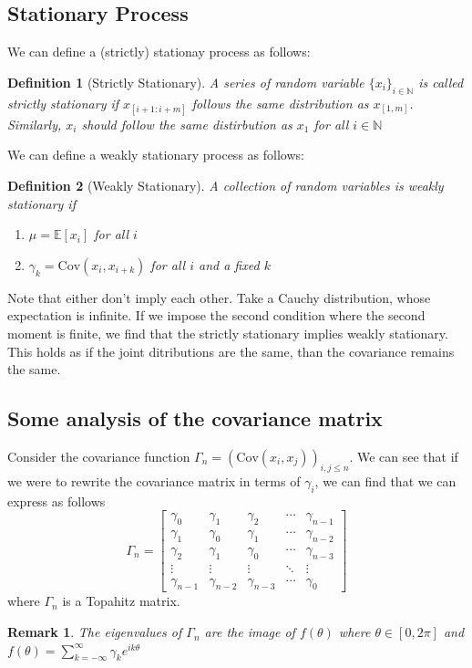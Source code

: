 \documentclass[12pt]{article}
\newtheorem{definition}{Definition}
\newtheorem{remark}{Remark}
\newcommand{\N}{\mathbb{N}}
\newcommand{\E}{\mathbb{E}}
\newcommand{\Cov}{\text{Cov}}
\begin{document}
\subsection{Stationary Process}
We can define a (strictly) stationay process as follows:
\begin{definition}[Strictly Stationary]
	A series of random variable $\{x_i\}_{i \in \N}$ is called strictly stationary if $x_{[i+1: i+m]}$ follows the same distribution as $x_{[1, m]}$. Similarly, $x_i$ should follow the same distirbution as $x_1$ for all $i \in \N$
\end{definition}
We can define a weakly stationary process as follows:
\begin{definition}[Weakly Stationary]
	A collection of random variables is weakly stationary if 
	\begin{enumerate}
		\item $\mu = \E[x_i]$ for all $i$ 
		\item $\gamma_k = \Cov(x_i, x_{i+k})$ for all $i$ and a fixed $k$ 
	\end{enumerate}
\end{definition}
Note that either don't imply each other. Take a Cauchy distribution, whose expectation is infinite. If we impose the second condition where the second moment is finite, we find that the strictly stationary implies weakly stationary. This holds as if the joint ditributions are the same, than the covariance remains the same. 
\subsection{Some analysis of the covariance matrix}
Consider the covariance function $\Gamma_n = (\Cov(x_i, x_j))_{i, j \leq n}$. We can see that if we were to rewrite the covariance matrix in terms of $\gamma_i$, we can find that we can express as follows 
\[
	\Gamma_n = \begin{bmatrix} 
\gamma_0 & \gamma_1 & \gamma_2 & \cdots & \gamma_{n-1} \\ 
\gamma_1 & \gamma_0 & \gamma_1 & \cdots & \gamma_{n-2} \\ 
\gamma_2 & \gamma_1 & \gamma_0 & \cdots & \gamma_{n-3} \\ 
\vdots & \vdots & \vdots & \ddots & \vdots \\ 
\gamma_{n-1} & \gamma_{n-2} & \gamma_{n-3} & \cdots & \gamma_0 
\end{bmatrix}
\]
where $\Gamma_n$ is a Topahitz matrix. 
\begin{remark}
The eigenvalues of $\Gamma_n$ are the image of $f(\theta)$ where $\theta \in [0,2\pi]$ and $f(\theta) = \sum_{k = -\infty}^\infty \gamma_k e^{ik\theta}$ 
\end{remark}
\end{document}
